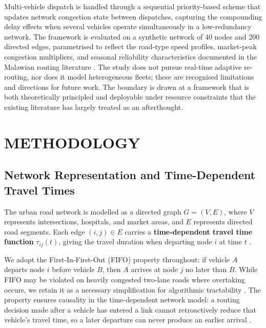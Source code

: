 \documentclass[paper=A4, 12pt, mathscr]{report}
\begin{document}
	Multi-vehicle dispatch is handled through a sequential priority-based scheme
	that updates network congestion state between dispatches, capturing the
	compounding delay effects when several vehicles operate simultaneously in
	a low-redundancy network. The framework is evaluated on a synthetic network
	of 40 nodes and 200 directed edges, parametrised to reflect the road-type
	speed profiles, market-peak congestion multipliers, and seasonal reliability
	characteristics documented in the Malawian routing literature \cite{8,9}.
	The study does not pursue real-time adaptive re-routing, nor does it model
	heterogeneous fleets; these are recognised limitations and directions for
	future work. The boundary is drawn at a framework that is both theoretically
	principled and deployable under resource constraints that the existing
	literature has largely treated as an afterthought.
	
	
	
	\chapter{METHODOLOGY}
	\label{ch:methodology}
	
	\section{Network Representation and Time-Dependent Travel Times}
	
	The urban road network is modelled as a directed graph $G=(V, E)$,
	where $V$ represents intersections, hospitals, and market areas, and $E$
	represents directed road segments. Each edge $(i,j) \in E$ carries a
	\textbf{time-dependent travel time function} $\tau_{ij}(t)$, giving the
	travel duration when departing node $i$ at time $t$
	\cite{yan2021,13,humagain}.
	
	We adopt the First-In-First-Out (FIFO) property throughout: if vehicle
	$A$ departs node $i$ before vehicle $B$, then $A$ arrives at node $j$ no
	later than $B$. While FIFO may be violated on heavily congested two-lane
	roads where overtaking occurs, we retain it as a necessary simplification
	for algorithmic tractability \cite{14,16,humagain}. The property ensures
	causality in the time-dependent network model: a routing decision made
	after a vehicle has entered a link cannot retroactively reduce that
	vehicle's travel time, so a later departure can never produce an earlier
	arrival \cite{14}.
	
\end{document}
